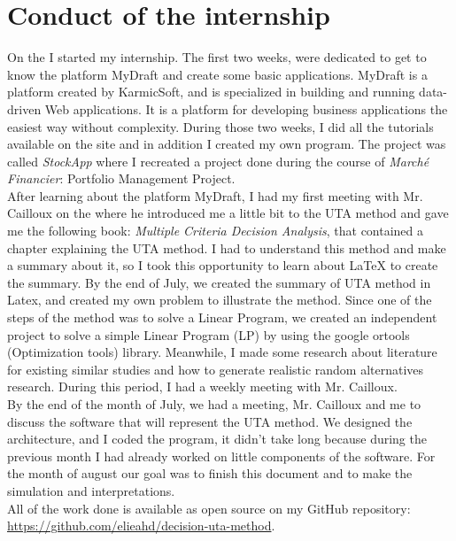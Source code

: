 \documentclass{report}
\begin{document}
\section{Conduct of the internship}
On the  I started my internship. The first two weeks, were dedicated to get to know the platform MyDraft and create some basic applications. MyDraft is a platform created by KarmicSoft, and is  specialized in building and running data-driven Web applications. It is a platform for developing business applications the easiest way without complexity. During those two weeks, I did all the tutorials available on the site and in addition I created my own program. The project was called \textit{StockApp} where I recreated a project done during the course of \textit{Marché Financier}: Portfolio Management Project.\\

After learning about the platform MyDraft, I had my first meeting with Mr. Cailloux on the  where he introduced me a little bit to the UTA method and gave me the following book: \textit{Multiple Criteria Decision Analysis}, that contained a chapter explaining the UTA method. I had to understand this method and make a summary about it, so I took this opportunity to learn about LaTeX to create the summary. By the end of July, we created the summary of UTA method in Latex, and created my own problem to illustrate the method. Since one of the steps of the method was to solve a Linear Program,  we created an independent project to solve a simple Linear Program (LP) by using the google ortools (Optimization tools) library. Meanwhile, I made some research about literature for existing similar studies and how to generate realistic random alternatives research. During this period, I had a weekly meeting with Mr. Cailloux.\\

By the end of the month of July, we had a meeting, Mr. Cailloux and me to discuss the software that will represent the UTA method. We designed the architecture, and I coded the program, it didn't take long because during the previous month I had already worked on little components of the software. For the month of august our goal was to finish this document and to make the simulation and interpretations.\\ 

All of the work done is available as open source on my GitHub repository: \url{ https://github.com/elieahd/decision-uta-method}.\\
\end{document}
